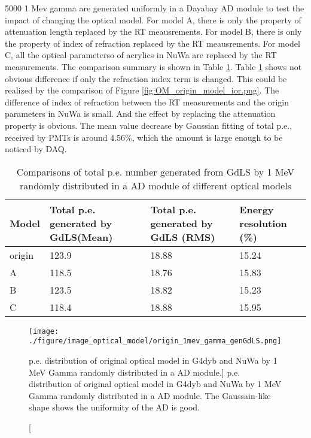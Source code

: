 5000 1 Mev gamma are generated uniformly in a Dayabay AD module to test the impact of changing the optical model.
For model A, there is only the property of attenuation length replaced by the RT meausrements.
For model B, there is only the property of index of refraction replaced by the RT meausrements.
For model C, all the optical parameterso of acrylics in NuWa are replaced by the RT measurements.
The comparison summary is shown in Table \ref{tab:peGenGdLSOpModel}.
Table \ref{tab:peGenGdLSOpModel} shows not obvious difference if only the refraction index term is changed.
This could be realized by the comparison of Figure \ref{fig:OM_origin_model_ior.png}. The difference of index of
refraction between the RT measurements and the origin parameters in NuWa is small.
And the effect by replacing the attenuation property is obvious. The mean value decrease by Gaussian fitting of total p.e., received by PMTs
is around 4.56\%, which the amount is large enough to be noticed by DAQ.



\begin{table}
\centering
\caption{Comparisons of total p.e. number generated from GdLS by 1 MeV randomly distributed in a AD module of different optical models}
\label{tab:peGenGdLSOpModel}
\begin{tabular}{lp{3.0cm}p{3.0cm}p{3.0cm}}
Model  &  Total p.e. generated by GdLS(Mean)  &    Total p.e. generated by GdLS (RMS) &     Energy resolution (\%) \\
\hline
\hline
origin  & 123.9 & 18.88 & 15.24 \\
A       & 118.5 & 18.76 & 15.83 \\
B       & 123.5 & 18.82 & 15.23 \\
C       & 118.4 & 18.88 & 15.95 \\
\hline
\end{tabular}
\end{table}




\begin{figure}[h]
    \centering
    \label{fig:origin_1mev_gamma_genGdLS.png}
    \texttt{[image: ./figure/image\_optical\_model/origin\_1mev\_gamma\_genGdLS.png]}
    \caption
[p.e. distribution of original optical model in G4dyb and NuWa by 1 MeV Gamma randomly distributed in a AD module.]
{p.e. distribution of original optical model in G4dyb and NuWa by 1 MeV Gamma randomly distributed in a AD module. The Gaussain-like shape shows the uniformity of the AD is good.}
    \end{figure}





